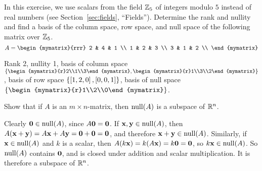 \begin{ex}
  In this exercise, we use scalars from the field $\mathbb{Z}_5$ of integers
  modulo $5$ instead of real numbers (see Section~\ref{sec:fields},
  ``Fields'').  Determine the rank and nullity and find a basis of the
  column space, row space, and null space of the following matrix over
  $\mathbb{Z}_5$.
  \begin{equation*}
    A = \begin{mymatrix}{rrr}
      2 & 4 & 1 \\
      1 & 2 & 3 \\
      3 & 1 & 2 \\
    \end{mymatrix}
  \end{equation*}
  \begin{sol}
    Rank 2, nullity 1, basis of column space
    $\set{\begin{mymatrix}{r}2\\1\\3\end{mymatrix},
    \begin{mymatrix}{r}1\\3\\2\end{mymatrix}}$, basis of row space
    $\left\{\left[1,2,0\right], \left[0,0,1\right]\right\}$, basis of null space
    $\set{\begin{mymatrix}{r}1\\2\\0\end{mymatrix}}$.    
  \end{sol}
\end{ex}

\begin{ex}
  Show that if $A$ is an $m\times n$-matrix, then $\nullspace(A)$
  is a subspace of $\mathbb{R}^n$.
  \begin{sol}
    Clearly $\vect{0}\in\nullspace(A)$, since $A\vect{0}=\vect{0}$.
    If $\vect{x},\vect{y}\in\nullspace(A)$, then
    $A(\vect{x}+\vect{y}) = A\vect{x}+A\vect{y} = \vect{0}+\vect{0} =
    \vect{0}$, and therefore
    $\vect{x}+\vect{y}\in\nullspace(A)$. Similarly, if
    $\vect{x}\in\nullspace(A)$ and $k$ is a scalar, then
    $A(k\vect{x})=k(A\vect{x})=k\vect{0}=\vect{0}$, so
    $k\vect{x}\in\nullspace(A)$. So $\nullspace(A)$ contains
    $\vect{0}$, and is closed under addition and scalar
    multiplication. It is therefore a subspace of $\mathbb{R}^n$.
  \end{sol}
\end{ex}

